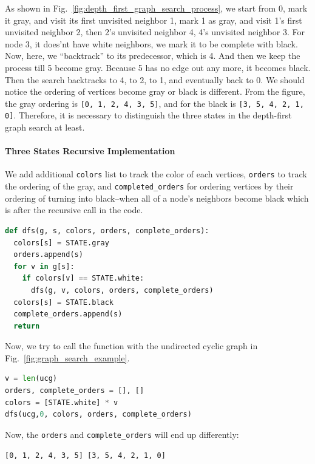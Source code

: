 \documentclass[main.tex]{subfiles}
\begin{document}
As shown in Fig.~\ref{fig:depth_first_graph_search_process}, we
start from 0, mark it gray, and visit its first unvisited neighbor 1, mark 1 as gray, and visit 1's first unvisited neighbor 2, then 2's unvisited neighbor 4, 4's unvisited neighbor 3.  For node 3, it does'nt have white neighbors, we mark it to be complete with black. Now, here, we ``backtrack'' to its predecessor, which is 4. And then we keep the process till 5 become gray. Because 5 has no edge out any more, it becomes black. Then the search backtracks to 4,  to 2, to 1, and eventually back to 0. We should notice the ordering of vertices become gray or black is different. From the figure, the gray ordering is \texttt{[0, 1, 2, 4, 3, 5]}, and for the black is \texttt{[3, 5, 4, 2, 1, 0]}. Therefore, it is necessary to distinguish the three states in the depth-first graph search at least. 


\paragraph{Three States Recursive Implementation} 
We add additional \texttt{colors} list to track the color of each vertices, \texttt{orders} to track the ordering of the gray, and \texttt{completed\_orders} for ordering vertices by their ordering of turning into black--when all of a node's neighbors become black which is after the recursive call in the code.  
\begin{lstlisting}[language = Python]
def dfs(g, s, colors, orders, complete_orders):
  colors[s] = STATE.gray
  orders.append(s)
  for v in g[s]:
    if colors[v] == STATE.white:
      dfs(g, v, colors, orders, complete_orders)
  colors[s] = STATE.black
  complete_orders.append(s)
  return
\end{lstlisting}
Now, we try to call the function with the undirected cyclic graph in Fig.~\ref{fig:graph_search_example}.
\begin{lstlisting}[language=Python]
v = len(ucg)
orders, complete_orders = [], []
colors = [STATE.white] * v
dfs(ucg,0, colors, orders, complete_orders)
\end{lstlisting}
Now, the \texttt{orders} and \texttt{complete\_orders} will end up differently:
\begin{lstlisting}[numbers=none]
[0, 1, 2, 4, 3, 5] [3, 5, 4, 2, 1, 0]
\end{lstlisting}
\end{document}
